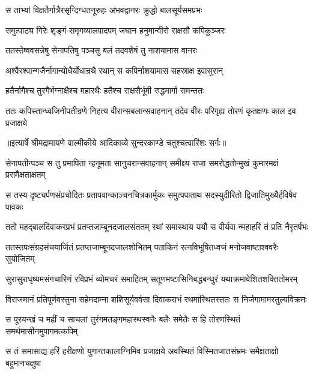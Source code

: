 \twolineshloka
{स ताभ्यां विक्षतैर्गात्रैरसृग्दिग्धतनूरुहः}
{अभवद्वानरः क्रुद्धो बालसूर्यसमप्रभः} %

\twolineshloka
{समुत्पाट्य गिरेः शृङ्गं समृगव्यालपादपम्}
{जघान हनुमान्वीरो राक्षसौ कपिकुञ्जरः} %

\twolineshloka
{ततस्तेष्ववसन्नेषु सेनापतिषु पञ्चसु}
{बलं तदवशेषं तु नाशयामास वानरः} %

\twolineshloka
{अश्वैरश्वान्गजैर्नागान्योधैर्योधान्रथै रथान्}
{स कपिर्नाशयामास सहस्राक्ष इवासुरान्} %

\twolineshloka
{हतैर्नागैश्च तुरगैर्भग्नाक्षैश्च महारथैः}
{हतैश्च राक्षसैर्भूमी रुद्धमार्गा समन्ततः} %

\fourlineindentedshloka
{ततः कपिस्तान्ध्वजिनीपतीन्रणे}
{ निहत्य वीरान्सबलान्सवाहनान्}
{तदेव वीरः परिगृह्य तोरणं}
{ कृतक्षणः काल इव प्रजाक्षये} %


{॥इत्यार्षे श्रीमद्रामायणे वाल्मीकीये आदिकाव्ये सुन्दरकाण्डे चतुश्चत्वारिंशः सर्गः॥}


\fourlineindentedshloka
{सेनापतीन्पञ्च स तु प्रमापिता}
{न्हनूमता सानुचरान्सवाहनान्}
{समीक्ष्य राजा समरोद्धतोन्मुखं}
{ कुमारमक्षं प्रसमैक्षताक्षतम्} %

\fourlineindentedshloka
{स तस्य दृष्ट्यर्पणसंप्रचोदितः}
{ प्रतापवान्काञ्चनचित्रकार्मुकः}
{समुत्पपाताथ सदस्युदीरितो}
{ द्विजातिमुख्यैर्हविषेव पावकः} %

\fourlineindentedshloka
{ततो महद्बालदिवाकरप्रभं}
{ प्रतप्तजाम्बूनदजालसंततम्}
{रथां समास्थाय ययौ स वीर्यवा}
{न्महाहरिं तं प्रति नैरृतर्षभः} %

\fourlineindentedshloka
{ततस्तपःसंग्रहसंचयार्जितं}
{ प्रतप्तजाम्बूनदजालशोभितम्}
{पताकिनं रत्नविभूषितध्वजं}
{ मनोजवाष्टाश्ववरैः सुयोजितम्} %

\fourlineindentedshloka
{सुरासुराधृष्यमसंगचारिणं}
{ रविप्रभं व्योमचरं समाहितम्}
{सतूणमष्टासिनिबद्धबन्धुरं}
{ यथाक्रमावेशितशक्तितोमरम्} %

\fourlineindentedshloka
{विराजमानं प्रतिपूर्णवस्तुना}
{ सहेमदाम्ना शशिसूर्यवर्वसा}
{दिवाकराभं रथमास्थितस्ततः}
{ स निर्जगामामरतुल्यविक्रमः} %

\fourlineindentedshloka
{स पूरयन्खं च महीं च साचलां}
{ तुरंगमतङ्गमहारथस्वनैः}
{बलैः समेतैः स हि तोरणस्थितं}
{ समर्थमासीनमुपागमत्कपिम्} %

\fourlineindentedshloka
{स तं समासाद्य हरिं हरीक्षणो}
{ युगान्तकालाग्निमिव प्रजाक्षये}
{अवस्थितं विस्मितजातसंभ्रमः}
{ समैक्षताक्षो बहुमानचक्षुषा} %

